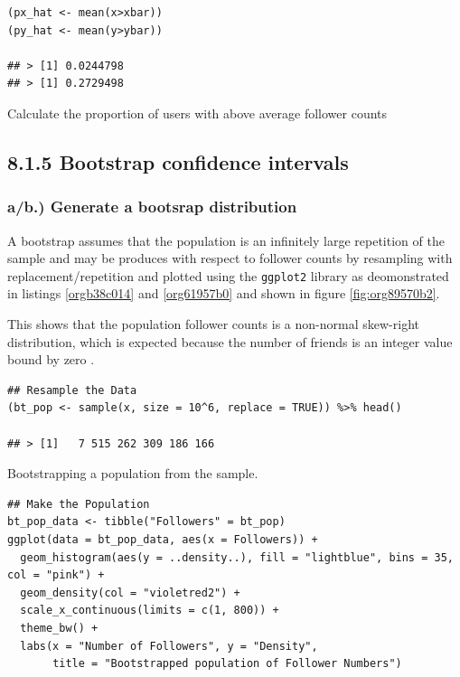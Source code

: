 \documentclass[11pt]{article}
\begin{document}
\begin{listing}[htbp]
\begin{verbatim}
(px_hat <- mean(x>xbar))
(py_hat <- mean(y>ybar))

## > [1] 0.0244798
## > [1] 0.2729498
\end{verbatim}
\caption{\label{orgab9ab28}Calculate the proportion of users with above average follower counts}
\end{listing}


\subsection{8.1.5 Bootstrap confidence intervals}
\label{sec:org9fc45bc}
\subsubsection{a/b.) Generate a bootsrap distribution}
\label{sec:orgfd05ef2}

A bootstrap assumes that the population is an infinitely large repetition of the
sample and may be produces with respect to follower counts by resampling with
replacement/repetition and plotted using the \texttt{ggplot2} library as deomonstrated
in listings \ref{orgb38c014} and \ref{org61957b0} and shown in figure \ref{fig:org89570b2}.

This shows that the population follower counts is a non-normal skew-right
distribution, which is expected because the number of friends is an integer value bound by zero \cite{nist2013}.

\begin{listing}[htbp]
\begin{verbatim}
## Resample the Data
(bt_pop <- sample(x, size = 10^6, replace = TRUE)) %>% head()

## > [1]   7 515 262 309 186 166
\end{verbatim}
\caption{\label{orgb38c014}Bootstrapping a population from the sample.}
\end{listing}

\begin{listing}[htbp]
\begin{verbatim}
## Make the Population
bt_pop_data <- tibble("Followers" = bt_pop)
ggplot(data = bt_pop_data, aes(x = Followers)) +
  geom_histogram(aes(y = ..density..), fill = "lightblue", bins = 35, col = "pink") +
  geom_density(col = "violetred2") +
  scale_x_continuous(limits = c(1, 800)) +
  theme_bw() +
  labs(x = "Number of Followers", y = "Density",
       title = "Bootstrapped population of Follower Numbers")

\end{verbatim}
\label{org61957b0}
\end{listing}
\end{document}
